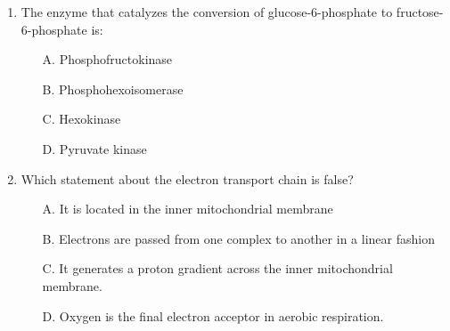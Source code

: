 \documentclass{article}
\begin{document}
\begin{enumerate}
    \item The enzyme that catalyzes the conversion of glucose-6-phosphate to fructose-6-phosphate is:
    \begin{itemize}
        \item[A.] Phosphofructokinase
        \item[B.] Phosphohexoisomerase
        \item[C.] Hexokinase
        \item[D.] Pyruvate kinase
    \end{itemize}

    \item Which statement about the electron transport chain is false?
    \begin{itemize}
        \item[A.] It is located in the inner mitochondrial membrane
        \item[B.] Electrons are passed from one complex to another in a linear fashion
        \item[C.]  It generates a proton gradient across the inner mitochondrial membrane.
        \item[D.]  Oxygen is the final electron acceptor in aerobic respiration.
    \end{itemize}


\end{enumerate}
\end{document}
